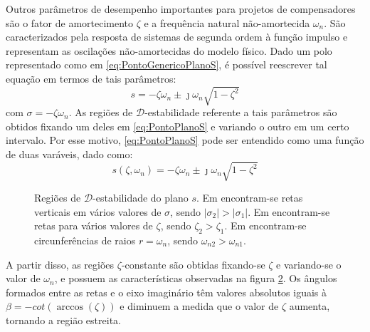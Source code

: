 Outros parâmetros de desempenho importantes para projetos de compensadores são o fator de amortecimento $\zeta$ e a frequência natural não-amortecida $\omega_n$. São caracterizados pela resposta de sistemas de segunda ordem à função impulso \cite{NISE2011}\cite{OGATA2011} e representam as oscilações não-amortecidas do modelo físico. Dado um polo representado como em \eqref{eq:PontoGenericoPlanoS}, é possível reescrever tal equação em termos de tais parâmetros:
\begin{equation}
  s = -\zeta\omega_n \pm \jmath\omega_n \sqrt {1-\zeta^2} \label{eq:PontoPlanoS}
\end{equation}
com $\sigma = -\zeta\omega_n$. As regiões de $\mathscr{D}$-estabilidade referente a tais parâmetros são obtidos fixando um deles em \eqref{eq:PontoPlanoS} e variando o outro em um certo intervalo. Por esse motivo, \eqref{eq:PontoPlanoS} pode ser entendido como uma função de duas varáveis, dado como:
\begin{equation}
  s(\zeta,\omega_n) = -\zeta\omega_n \pm \jmath\omega_n \sqrt {1-\zeta^2} \label{eq:FuncaoPontoPlanoS}
\end{equation}

\begin{figure}[!ht]
  \centering
  \begin{subfigure}[t]{0.3\columnwidth}
      
      \caption{}
      \label{subfig:EstabilidadeRelativaS}
  \end{subfigure}
  \begin{subfigure}[t]{0.3\columnwidth}
      
      \caption{}
      \label{subfig:TaxaDeAmortecimentoS}
  \end{subfigure}
  \begin{subfigure}[t]{0.35\columnwidth}
    
    \caption{}
    \label{subfig:OscilacaoNaoAmortecidaS}
  \end{subfigure}
  \caption{Regiões de $\mathscr{D}$-estabilidade do plano $s$. Em  encontram-se retas verticais em vários valores de $\sigma$, sendo $|\sigma_2| > |\sigma_1|$. Em  encontram-se retas para vários valores de $\zeta$, sendo $\zeta_2 > \zeta_1$. Em  encontram-se circunferências de raios $r = \omega_n$, sendo $\omega_{n2} > \omega_{n1}$.}
  \label{fig:RegioesPlanoS}
\end{figure}

A partir disso, as regiões $\zeta$-constante são obtidas fixando-se $\zeta$ e variando-se o valor de $\omega_n$, e possuem as características observadas na figura \ref{subfig:TaxaDeAmortecimentoS}. Os ângulos formados entre as retas e o eixo imaginário têm valores absolutos iguais à $\beta = -cot{\left(\arccos{\left(\zeta\right)}\right)}$ e diminuem a medida que o valor de $\zeta$ aumenta, tornando a região estreita.

